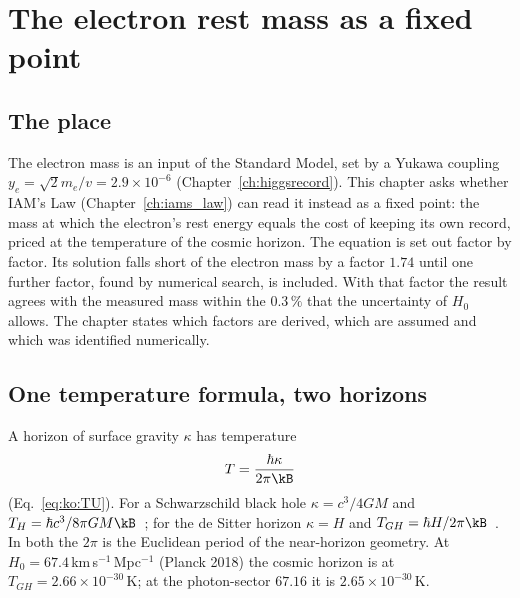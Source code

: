 \chapter{The electron rest mass as a fixed point}\label{ch:electronmass}

\section*{The place}
The electron mass is an input of the Standard Model, set by a Yukawa coupling $y_e=\sqrt2m_e/v=2.9\times10^{-6}$ (Chapter~\ref{ch:higgsrecord}).
This chapter asks whether IAM's Law (Chapter~\ref{ch:iams_law}) can read it instead as a fixed point: the mass at which the electron's rest energy
equals the cost of keeping its own record, priced at the temperature of the cosmic horizon. The equation is set out factor by factor. Its
solution falls short of the electron mass by a factor $1.74$ until one further factor, found by numerical search, is included. With that factor
the result agrees with the measured mass within the $0.3\,\%$ that the uncertainty of $H_0$ allows. The chapter states which factors are derived,
which are assumed and which was identified numerically.

\section{One temperature formula, two horizons}\label{sec:em:horizons}
A horizon of surface gravity $\kappa$ has temperature
\begin{equation}
T=\frac{\hbar\kappa}{2\pi\kB}\label{eq:em:T}
\end{equation}
(Eq.~\eqref{eq:ko:TU}). For a Schwarzschild black hole $\kappa=c^3/4GM$ and $T_H=\hbar c^3/8\pi GM\kB$~\cite{Hawking1975}; for the de Sitter horizon
$\kappa=H$ and $T_{GH}=\hbar H/2\pi\kB$~\cite{GibbonsHawking1977}. In both the $2\pi$ is the Euclidean period of the near-horizon geometry. \derived{}
At $H_0=67.4$\,km\,s$^{-1}$\,Mpc$^{-1}$ (Planck 2018) the cosmic horizon is at $T_{GH}=2.66\times10^{-30}$\,K; at the photon-sector $67.16$ it is $2.65\times10^{-30}$\,K. \calc

